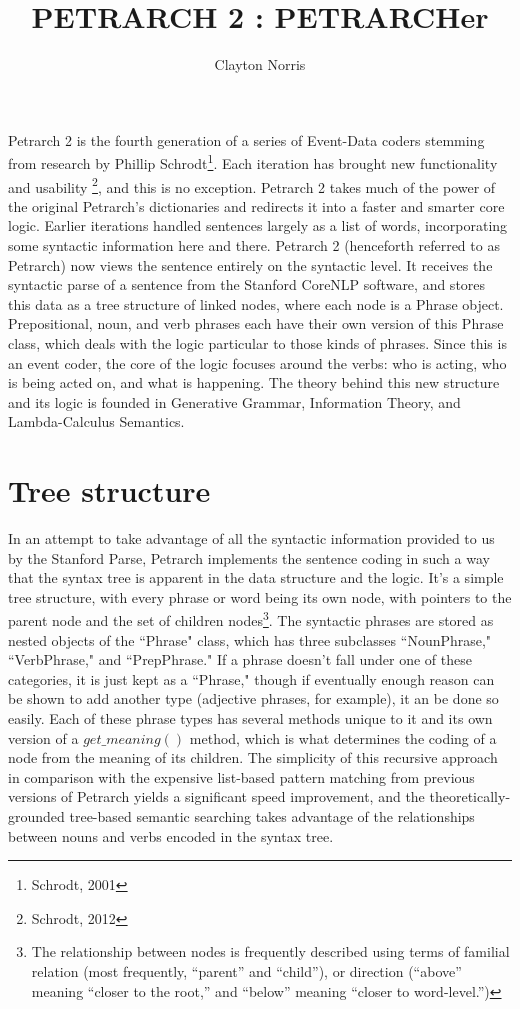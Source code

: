 \documentclass[11pt]{article}
\title{PETRARCH 2 : PETRARCHer}
\author{Clayton Norris}
\date{}
\begin{document}
\maketitle
Petrarch 2 is the fourth generation of a series of Event-Data coders stemming from research by 
Phillip Schrodt\footnote{Schrodt, 2001}. Each iteration has brought new functionality and usability \footnote{Schrodt, 2012}, and this is no exception.
Petrarch 2 takes much of the power of the original Petrarch's dictionaries and redirects it 
into a faster and smarter core logic. Earlier iterations handled sentences 
largely as a list of words, incorporating some syntactic information here and 
there. Petrarch 2 (henceforth referred to as Petrarch) now views the sentence entirely on the syntactic level. It 
receives the syntactic parse of a sentence from the Stanford CoreNLP 
software, and stores this data as a tree structure of linked nodes, 
where each node is a Phrase object. Prepositional, noun, and verb phrases each 
have their own version of this Phrase class, which deals with the logic 
particular to those kinds of phrases. Since this is an event coder, the core of 
the logic focuses around the verbs: who is acting, who is being acted on, and 
what is happening. The theory behind this new structure and its logic is founded 
in Generative Grammar, Information Theory, and Lambda-Calculus Semantics. 

\section{Tree structure}
In an attempt to take advantage of all the syntactic information provided to us 
by the Stanford Parse, Petrarch implements the sentence coding in such a way that 
the syntax tree is apparent in the data structure and the logic. It's a simple tree 
structure, with every phrase or word being its own node, with pointers to the 
parent node and the set of children nodes\footnote{The relationship between nodes 
is frequently described using terms of familial relation (most frequently, ``parent'' and ``child''), or direction (``above'' meaning ``closer to the 
root,'' and ``below'' meaning ``closer to word-level.'')}. 
The syntactic phrases are stored as nested objects of the ``Phrase" 
class, which has three subclasses ``NounPhrase," ``VerbPhrase," and ``PrepPhrase." 
If a phrase doesn't fall under one of these categories, it is just kept as a 
``Phrase," though if eventually enough reason can be shown to add another type (adjective phrases, for example),
it an be done so easily. Each of these phrase types has several methods unique to it 
and its own version of a $get\_meaning()$ method, which is what determines the 
coding of a node from the meaning of its children. The simplicity of this recursive approach in comparison 
with the expensive list-based pattern matching from previous versions of Petrarch yields a 
significant speed improvement, 
and the theoretically-grounded tree-based semantic searching takes advantage of 
the relationships between nouns and verbs encoded in the syntax tree. 
\end{document}
